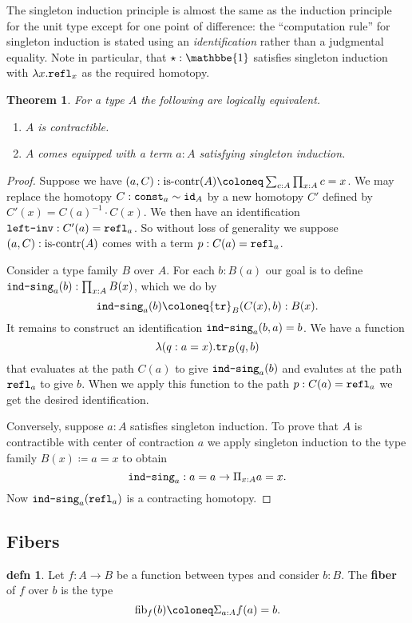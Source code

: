 \documentclass{amsart}
\theoremstyle{theorem}
\newtheorem*{thm}{Theorem}
\theoremstyle{definition}
\newtheorem*{defn}{defn}
\theoremstyle{remark}
\newcommand{\0}{\mathbbe{0}}
\newcommand{\1}{\mathbbe{1}}
\newcommand{\2}{\mathbbe{2}}
\newcommand{\3}{\mathbbe{3}}
\newcommand{\4}{\mathbbe{4}}
\newcommand{\term}[1]{{\textup{\texttt{#1}}}}
\newcommand{\type}[1]{{\textup{#1}}}
\newcommand{\id}{\term{id}}
\newcommand{\refl}{\term{refl}}
\newcommand{\tr}{\term{tr}}
\newcommand{\is}[1]{\type{is-{#1}}}
\newcommand{\fib}{\type{fib}}
\begin{document}
The singleton induction principle is almost the same as the induction principle for the unit type except for one point of difference: the ``computation rule'' for singleton induction is stated using an \emph{identification} rather than a judgmental equality.  Note in particular, that $\star : \1$ satisfies singleton induction with $\lambda x . \refl_x$ as the required homotopy.

\begin{thm} For a type $A$ the following are logically equivalent.
\begin{enumerate}
\item $A$ is contractible.
\item $A$ comes equipped with a term $a : A$ satisfying singleton induction.
\end{enumerate}
\end{thm}
\begin{proof}
Suppose we have $(a,C) : \is{contr}(A) \coloneq \sum_{c :A} \prod_{x:A} c =x$. We may replace the homotopy $C : \term{const}_a \sim \id_A$ by a new homotopy $C'$ defined by $C'(x) = C(a)^{-1} \cdot C(x)$. We then have an identification $\term{left-inv} : C'(a) = \refl_a$. So without loss of generality we suppose $(a,C) : \is{contr}(A)$ comes with a term $p : C(a) = \refl_a$.

Consider a type family $B$ over $A$. For each $b : B(a)$ our goal is to define $\term{ind-sing}_a(b) : \prod_{x:A}B(x)$, which we do by
\[ \term{ind-sing}_a(b) \coloneq \tr_B(C(x),b) : B(x).\]
It remains to construct an identification $\term{ind-sing}_a(b,a) = b$. We have a function
\[ \lambda (q : a=x). \tr_B(q,b)\] that evaluates at the path $C(a)$ to give $\term{ind-sing}_a(b)$ and evalutes at the path $\refl_a$ to give $b$. When we apply this function to the path $p : C(a) = \refl_a$ we get the desired identification.

Conversely, suppose $a :A$ satisfies singleton induction. To prove that $A$ is contractible with center of contraction $a$ we apply singleton induction to the type family $B(x) \coloneq a = x$ to obtain \[\term{ind-sing}_a : a =a \to \Pi_{x:A} a=x.\] Now $\term{ind-sing}_a(\refl_a)$ is a contracting homotopy.
\end{proof}

\subsection*{Fibers}

\begin{defn} Let $f \colon A \to B$ be a function between types and consider $b : B$. The \textbf{fiber} of $f$ over $b$ is the type
\[ \fib_f(b) \coloneq \Sigma_{a:A} f(a) =b.\]
\end{defn}
\end{document}

